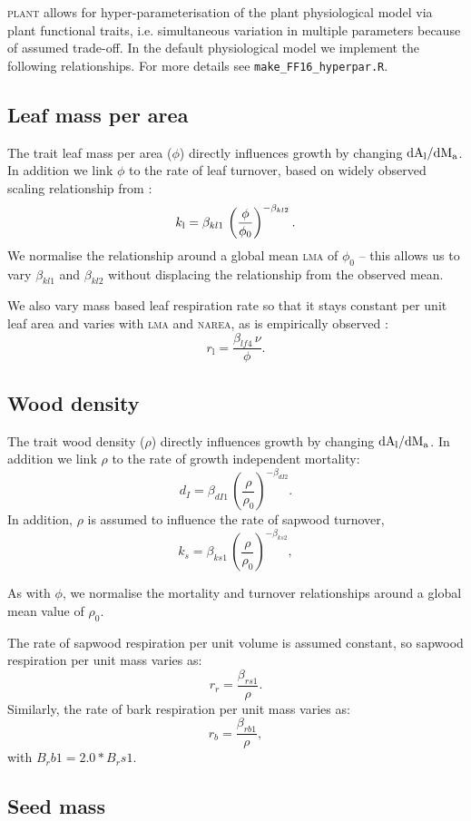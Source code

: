 \documentclass[10pt,twoside]{article}
\newcommand{\plant}{\textsc{plant}}
\begin{document}
{\plant} allows for
hyper-parameterisation of the plant physiological model via plant functional traits, i.e.
simultaneous variation in multiple parameters because of assumed trade-off. In the
default physiological model we implement the following relationships. For more
details see \texttt{make\_FF16\_hyperpar.R}.

\subsection{Leaf mass per area}

The trait leaf mass per area ($\phi$) directly influences growth by changing
$\rm{d}A_\textrm{l} / \rm{d}M_\textrm{a}$. In addition we
link $\phi$ to the rate of leaf turnover,
based on widely observed scaling relationship from \citet{Wright-2004}:
$$k_{\rm l} = \beta_{kl1} \, \left(\frac{\phi}{\phi_0}\right)^{-\beta_{kl2}}.$$
We normalise the relationship around a global mean \textsc{lma} of $\phi_0$ -- this
allows us to vary $\beta_{kl1}$ and $\beta_{kl2}$ without displacing the relationship from the
observed mean.

We also vary mass based leaf respiration rate so that it stays constant per unit leaf area and
varies with \textsc{lma} and \textsc{narea}, as is empirically observed \citet{Wright-2004}:
$$r_\textrm{l} = \frac{\beta_{lf4}\, \nu}{\phi}.$$

\subsection{Wood density}

The trait wood density ($\rho$) directly influences growth by changing
$\rm{d}A_\textrm{l} / \rm{d}M_\textrm{a}$.  In addition we
link $\rho$ to the rate of growth independent mortality:
$$d_I = \beta_{dI1} \, \left(\frac{\rho}{\rho_0}\right) ^ {-\beta_{dI2}}.$$
In addition, $\rho$ is assumed to influence the rate of sapwood turnover,
$$k_s = \beta_{ks1} \, \left(\frac{\rho}{\rho_0}\right)^ {-\beta_{ks2}},$$

As with $\phi$, we normalise the mortality and turnover
relationships around a global mean value of $\rho_0$.

The rate of sapwood respiration per unit volume is assumed constant, so
sapwood respiration per unit mass varies as:
$$r_r = \frac{\beta_{rs1}}{\rho}.$$
Similarly, the rate of bark respiration per unit mass varies as:
$$r_b = \frac{\beta_{rb1}}{\rho},$$
with $B_rb1 = 2.0*B_rs1$.

\subsection{Seed mass}
\end{document}
